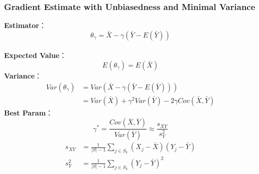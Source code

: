 \documentclass{beamer}
\begin{document}
\begin{frame}
	\frametitle{\bf Gradient Estimate with Unbiasedness and Minimal Variance} 
	\textbf { Estimator}：$$\theta_{\gamma}=\bar{X}-\gamma(\bar{Y}-E(\bar{Y}))$$ \\
	\textbf { Expected Value}：$$E(\theta_{\gamma})=E(\bar{X})$$
	\textbf { Variance}：\begin{equation}
		\begin{aligned}
			Var(\theta_{\gamma}) & =Var(\bar{X}-\gamma(\bar{Y}-E(\bar{Y})))\\
			& =Var(\bar{X})+\gamma^2 Var(\bar{Y})-2 \gamma Cov(\bar{X},\bar{Y})
			\label{2:variance}
		\end{aligned}
	\end{equation}
	\textbf { Best Param}：
\begin{equation}
		\gamma^*=\frac{Cov(\bar{X}, \bar{Y})}{Var(\bar{Y})}\approx \frac{s_{XY}}{s_Y^2}
			\label{3:gamma_star}
\end{equation}
\begin{equation}
	\begin{aligned}
		s_{XY}&=\frac{1}{|S|-1}\sum_{j\in S_k}(X_j-\bar{X})(Y_j-\bar{Y})\\
		s_{Y}^2&=\frac{1}{|S|-1}\sum_{j\in S_k}(Y_j-\bar{Y})^2
		\label{2:sample_variance}
	\end{aligned}
\end{equation}

\end{frame}
\end{document}
